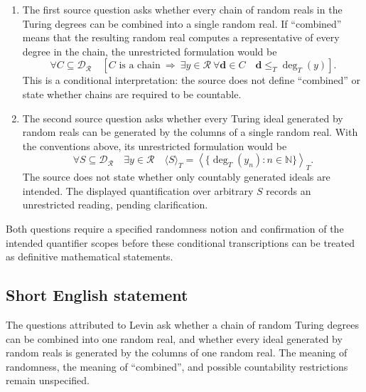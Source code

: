 \documentclass[11pt]{article}
\newcommand{\N}{\mathbb{N}}
\begin{document}
\begin{enumerate}
\item The first source question asks whether every chain of random reals in the Turing degrees can be combined into a single random real. If ``combined'' means that the resulting random real computes a representative of every degree in the chain, the unrestricted formulation would be
\[
\forall C\subseteq\mathcal D_{\mathcal R}\quad
\left[C\text{ is a chain}\ \Longrightarrow\
\exists y\in\mathcal R\ \forall\mathbf d\in C\quad
\mathbf d\leq_T\deg_T(y)\right].
\]
This is a conditional interpretation: the source does not define ``combined'' or state whether chains are required to be countable.
\item The second source question asks whether every Turing ideal generated by random reals can be generated by the columns of a single random real. With the conventions above, its unrestricted formulation would be
\[
\forall S\subseteq\mathcal D_{\mathcal R}\quad
\exists y\in\mathcal R\quad
\langle S\rangle_T
=\left\langle\{\deg_T(y_n):n\in\N\}\right\rangle_T.
\]
The source does not state whether only countably generated ideals are intended. The displayed quantification over arbitrary $S$ records an unrestricted reading, pending clarification.
\end{enumerate}
Both questions require a specified randomness notion and confirmation of the intended quantifier scopes before these conditional transcriptions can be treated as definitive mathematical statements.
\subsection{Short English statement}
The questions attributed to Levin ask whether a chain of random Turing degrees can be combined into one random real, and whether every ideal generated by random reals is generated by the columns of one random real. The meaning of randomness, the meaning of ``combined'', and possible countability restrictions remain unspecified.
\end{document}
